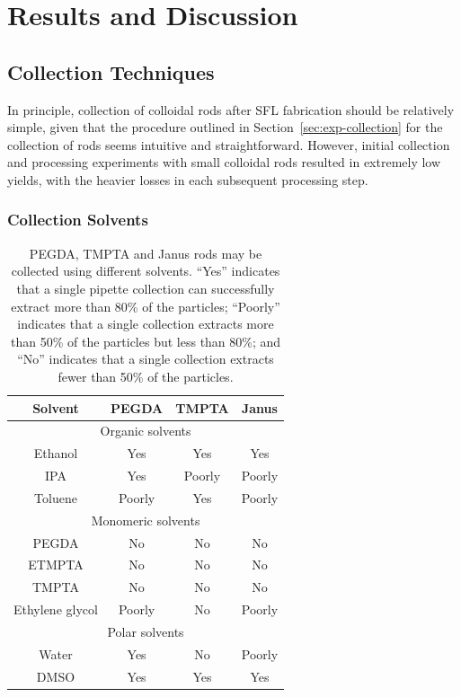 \section{Results and Discussion}

\subsection{Collection Techniques}
\label{sec:rod-collection}

In principle, collection of colloidal rods after SFL fabrication should be relatively simple,
given that the 
procedure outlined in Section~\ref{sec:exp-collection} for the collection of rods seems intuitive and
straightforward.  However, initial 
collection and processing experiments 
with small colloidal rods resulted in
extremely low yields, with the heavier losses in each subsequent processing step.


\subsubsection{Collection Solvents}

\begin{table}[h]
\begin{center}
\begin{tabular}{| c | c | c | c |}
\hline 
Solvent & PEGDA & TMPTA & Janus \\ \hline
\multicolumn{4}{|c|}{Organic solvents} \\ \hline
Ethanol & Yes & Yes & Yes \\
IPA & Yes & Poorly & Poorly \\
Toluene & Poorly & Yes & Poorly \\
\hline
\multicolumn{4}{|c|}{Monomeric solvents} \\ \hline
PEGDA & No & No & No \\
ETMPTA & No & No & No \\
TMPTA & No & No & No \\
Ethylene glycol & Poorly & No & Poorly \\
\hline
\multicolumn{4}{|c|}{Polar solvents} \\ \hline
Water & Yes & No & Poorly \\
DMSO & Yes & Yes & Yes \\
\hline
\end{tabular}

\end{center}
\caption{PEGDA, TMPTA and Janus rods may be collected using different solvents. ``Yes'' indicates that
a single pipette collection can successfully extract more than 80\% of the particles;
``Poorly'' indicates that a single collection extracts more than 50\% of the particles
but less than 80\%; and
``No'' indicates that a single collection extracts fewer than 50\% of the particles.}
\label{tab:collect-solvent}
\end{table}

